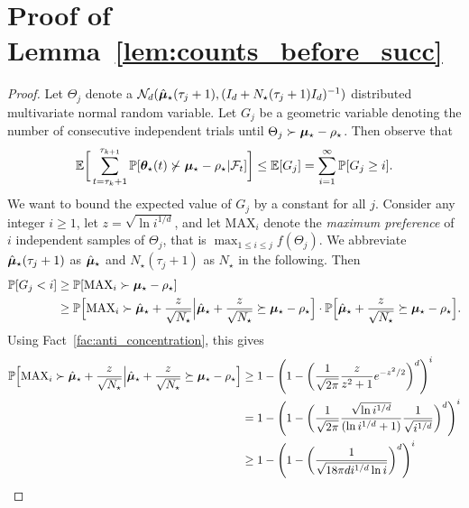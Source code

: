 \section{Proof of Lemma~\ref{lem:counts_before_succ}}
\label{app:proof:counts_before_succ}

\begin{proof}
    Let $\Theta_j$ denote a $\mathcal{N}_d (\hat {\boldsymbol{\mu}}_\star(\tau_j+1), (I_d + N_\star(\tau_j+1)I_d)^{-1})$ distributed multivariate normal random variable. Let $G_j$ be a geometric variable denoting the number of consecutive independent trials until $\Theta_j \succ \boldsymbol{\mu}_\star - \rho_\star$. Then observe that 
    \begin{align*}
         \mathbb{E} \bigg[ \sum_{t=\tau_k+1}^{\tau_{k+1}} \mathbb{P}[\boldsymbol{\theta}_\star(t) \not\succ \boldsymbol{\mu}_\star - \rho_\star | \mathcal{F}_t] \bigg]
         \leq \mathbb{E}[G_j]
         = \sum_{i = 1}^\infty \mathbb{P}[G_j \geq i].
    \end{align*}
    We want to bound the expected value of $G_j$ by a constant for all $j$. Consider any integer $i \geq 1$, let $z = \sqrt{\ln i^{1/d}}$, and let $\mathrm{MAX}_i$ denote the \emph{maximum preference} of $i$ independent samples of $\Theta_j$, that is $\max_{1 \leq i \leq j} f(\Theta_j)$. We abbreviate $\hat {\boldsymbol{\mu}}_\star(\tau_j+1)$ as $\hat {\boldsymbol{\mu}}_\star$ and $N_\star(\tau_j+1)$ as $N_\star$ in the following. Then
    \begin{align*}
        \mathbb{P}[G_j < i]
        & \geq \mathbb{P}[\mathrm{MAX}_i \succ \boldsymbol{\mu}_\star - \rho_\star] \\
        & \geq \mathbb{P} \Big[ \mathrm{MAX}_i \succ \hat {\boldsymbol{\mu}}_\star + \frac{z}{\sqrt{N_\star}} \Big| \hat {\boldsymbol{\mu}}_\star + \frac{z}{\sqrt{N_\star}} \succeq \boldsymbol{\mu}_\star - \rho_\star \Big]
        \cdot \mathbb{P} \Big[ \hat {\boldsymbol{\mu}}_\star + \frac{z}{\sqrt{N_\star}} \succeq \boldsymbol{\mu}_\star - \rho_\star \Big].
    \end{align*}
    Using Fact~\ref{fac:anti_concentration}, this gives
    \begin{align*}
        \Pr \Big[ \mathrm{MAX}_i \succ \hat \bsmu_\star + \frac{z}{\sqrt{N_\star}} \Big| \hat \bsmu_\star + \frac{z}{\sqrt{N_\star}} \succeq \bsmu_\star - \rho_\star \Big]
        & \geq 1 - \Bigg( 1 - \bigg( \frac{1}{\sqrt{2\pi}} \frac{z}{z^2 + 1} e^{-z^2/2} \bigg)^d \Bigg)^i \\
        & = 1 - \Bigg( 1 - \bigg( \frac{1}{\sqrt{2\pi}} \frac{\sqrt{\ln i^{1/d}}}{(\ln i^{1/d} + 1)} \frac{1}{\sqrt{i^{1/d}}} \bigg)^d \Bigg)^i \\
        & \geq 1 - \Bigg( 1 - \bigg( \frac{1}{\sqrt{18 \pi d i^{1/d} \ln i}} \bigg)^d \Bigg)^i \\

\end{align*}
\end{proof}
